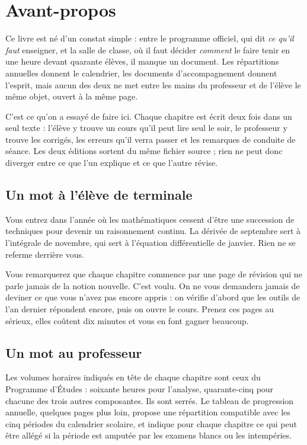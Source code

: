 \chapter*{Avant-propos}

Ce livre est né d'un constat simple : entre le programme officiel, qui dit
\emph{ce qu'il faut} enseigner, et la salle de classe, où il faut décider
\emph{comment} le faire tenir en une heure devant quarante élèves, il manque
un document. Les répartitions annuelles donnent le calendrier, les documents
d'accompagnement donnent l'esprit, mais aucun des deux ne met entre les mains
du professeur et de l'élève le même objet, ouvert à la même page.

C'est ce qu'on a essayé de faire ici. Chaque chapitre est écrit deux fois dans
un seul texte : l'élève y trouve un cours qu'il peut lire seul le soir, le
professeur y trouve les corrigés, les erreurs qu'il verra passer et les
remarques de conduite de séance. Les deux éditions sortent du même fichier
source ; rien ne peut donc diverger entre ce que l'un explique et ce que
l'autre révise.

\section*{Un mot à l'élève de terminale}

Vous entrez dans l'année où les mathématiques cessent d'être une succession
de techniques pour devenir un raisonnement continu. La dérivée de septembre
sert à l'intégrale de novembre, qui sert à l'équation différentielle de
janvier. Rien ne se referme derrière vous.

Vous remarquerez que chaque chapitre commence par une page de révision qui
ne parle jamais de la notion nouvelle. C'est voulu. On ne vous demandera
jamais de deviner ce que vous n'avez pas encore appris : on vérifie d'abord
que les outils de l'an dernier répondent encore, puis on ouvre le cours.
Prenez ces pages au sérieux, elles coûtent dix minutes et vous en font gagner
beaucoup.

\section*{Un mot au professeur}

Les volumes horaires indiqués en tête de chaque chapitre sont ceux du
Programme d'Études : soixante heures pour l'analyse, quarante-cinq pour
chacune des trois autres composantes. Ils sont serrés. Le tableau de
progression annuelle, quelques pages plus loin, propose une répartition
compatible avec les cinq périodes du calendrier scolaire, et indique pour
chaque chapitre ce qui peut être allégé si la période est amputée par les
examens blancs ou les intempéries.

